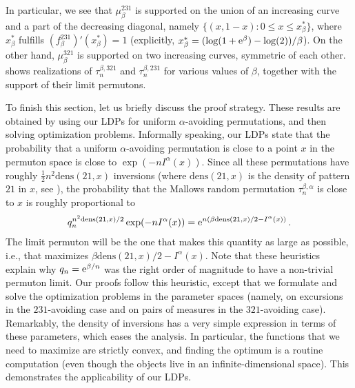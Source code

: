 \documentclass[a4paper,11pt]{amsart}
\newcommand{\ee}{\textup{e}}
\newcommand{\dens}[2]{\mathrm{dens}\left(#1,#2\right)}
\theoremstyle{definition}
\begin{document}
In particular, we see that $\mu^{231}_\beta$ is supported on the union of an increasing curve
and a part of the decreasing diagonal, namely $\{(x,1-x): 0 \le x \le x_\beta^*\}$,
where $x_\beta^*$ fulfills $(f^{231}_\beta)'(x_\beta^*)=1$ 
(explicitly, $x_\beta^* = (\log(1+\ee^\beta)-\log(2) )/\beta$). On the other hand,   $\mu^{321}_\beta$ is supported on two increasing curves, symmetric of each other.
 shows realizations of $\tau^{\beta,321}_{n}$ and $\tau^{\beta,231}_{n}$ for various values of $\beta$, together with the support of their limit permutons.
\medskip
 
To finish this section, let us briefly discuss the proof strategy.
These results are obtained by using our LDPs for uniform $\alpha$-avoiding permutations, and then solving optimization problems. 
Informally speaking, our LDPs state that the probability that a uniform $\alpha$-avoiding permutation is close to a point $x$ in the permuton space is close to $\exp(-n I^\alpha(x))$.
Since all these permutations have roughly
$\frac12 n^2 \dens{21}{x}$ inversions 
(where $\dens{21}{x}$ is the density of pattern $21$ in $x$, see ), 
the probability that the Mallows random permutation $\tau^{\beta,\alpha}_{n}$ is close to $x$ is roughly proportional to
\[q_n^{n^2 \dens{21}{x}/2} \exp(-n I^\alpha(x)) = \ee^{n (\beta \dens{21}{x}/2 -I^\alpha(x))} \,.\]
The limit permuton will be the one that makes this quantity as large as possible,
i.e., that maximizes $\beta \dens{21}{x}/2 -I^\alpha(x)$. 
Note that these heuristics explain why $q_n=\ee^{\beta/n}$ was the right order of magnitude to have a non-trivial permuton limit.
Our proofs follow this heuristic, except that we formulate and solve the optimization
problems in the parameter spaces (namely,
 on excursions in the $231$-avoiding case and on pairs of measures in the $321$-avoiding case).
Remarkably, the density of inversions has a very simple expression in terms of these parameters, which eases the analysis.
In particular, the functions that we need to maximize are strictly convex,
and finding the optimum is a routine computation 
(even though the objects live in an infinite-dimensional space). 
This demonstrates the applicability of our LDPs.
\end{document}
